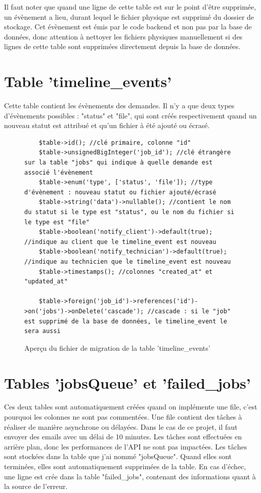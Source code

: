 \documentclass[
    iai, %
    eai, %
]{heig-tb}
\begin{document}
Il faut noter que quand une ligne de cette table est sur le point d'être supprimée, un évènement a lieu, durant lequel le fichier physique est supprimé du dossier de stockage.
Cet évènement est émis par le code backend et non pas par la base de données, donc attention à nettoyer les fichiers physiques manuellement si des lignes de cette table sont supprimées directement depuis la base de données.

\newpage
\section{Table 'timeline\_events'}
Cette table contient les évènements des demandes. Il n'y a que deux types d'évènements possibles : "status" et "file", qui sont créés respectivement quand un nouveau statut est attribué et qu'un fichier à été ajouté ou écrasé.

\begin{figure}[h]
  \begin{verbatim}
    $table->id(); //clé primaire, colonne "id"
    $table->unsignedBigInteger('job_id'); //clé étrangère sur la table "jobs" qui indique à quelle demande est associé l'évènement
    $table->enum('type', ['status', 'file']); //type d'évènement : nouveau statut ou fichier ajouté/écrasé
    $table->string('data')->nullable(); //contient le nom du statut si le type est "status", ou le nom du fichier si le type est "file"
    $table->boolean('notify_client')->default(true); //indique au client que le timeline_event est nouveau
    $table->boolean('notify_technician')->default(true); //indique au technicien que le timeline_event est nouveau
    $table->timestamps(); //colonnes "created_at" et "updated_at"

    $table->foreign('job_id')->references('id')->on('jobs')->onDelete('cascade'); //cascade : si le "job" est supprimé de la base de données, le timeline_event le sera aussi
  \end{verbatim}
  \caption{Aperçu du fichier de migration de la table 'timeline\_events'}
\end{figure}

\section{Tables 'jobsQueue' et 'failed\_jobs'}
Ces deux tables sont automatiquement créées quand on implémente une file, c'est pourquoi les colonnes ne sont pas commentées. Une file contient des tâches à réaliser de manière asynchrone ou délayées. Dans le cas de ce projet, il faut envoyer des emails avec un délai de 10 minutes. Les tâches sont effectuées en arrière plan, donc les performances de l'API ne sont pas impactées.
Les tâches sont stockées dans la table que j'ai nommé "jobsQueue". Quand elles sont terminées, elles sont automatiquement supprimées de la table. En cas d'échec, une ligne est crée dans la table "failed\_jobs", contenant des informations quant à la source de l'erreur.
\end{document}
